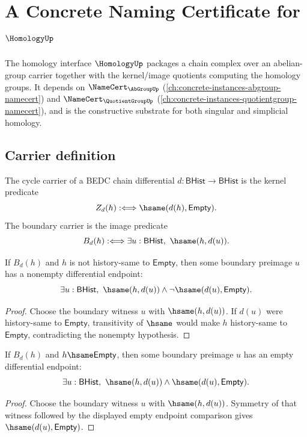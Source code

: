 \chapter{A Concrete Naming Certificate for $\HomologyUp$}
\label{ch:concrete-instances-homology-namecert}

The homology interface $\HomologyUp$ packages a chain complex over an abelian-group carrier together with the kernel/image quotients computing the homology groups. It depends on $\NameCert_{\AbGroupUp}$ (\autoref{ch:concrete-instances-abgroup-namecert}) and $\NameCert_{\QuotientGroupUp}$ (\autoref{ch:concrete-instances-quotientgroup-namecert}), and is the constructive substrate for both singular and simplicial homology.

\section{Carrier definition}
\label{sec:homology-carrier}

The cycle carrier of a BEDC chain differential $d:\mathsf{BHist}\to
\mathsf{BHist}$ is the kernel predicate
$$
Z_d(h) :\Longleftrightarrow \hsame(d(h),\mathsf{Empty}).
$$
The boundary carrier is the image predicate
$$
B_d(h) :\Longleftrightarrow \exists u:\mathsf{BHist},\ \hsame(h,d(u)).
$$

\begin{theorem}
\label{thm:homology-boundary-carrier-nonempty-preimage}
If $B_d(h)$ and $h$ is not history-same to $\mathsf{Empty}$, then some
boundary preimage $u$ has a nonempty differential endpoint:
$$
\exists u:\mathsf{BHist},\
\hsame(h,d(u))\land \neg\hsame(d(u),\mathsf{Empty}).
$$
\end{theorem}
\begin{proof}
Choose the boundary witness $u$ with $\hsame(h,d(u))$. If $d(u)$ were
history-same to $\mathsf{Empty}$, transitivity of $\hsame$ would make $h$
history-same to $\mathsf{Empty}$, contradicting the nonempty hypothesis.
\end{proof}

\begin{theorem}
\label{thm:homology-boundary-carrier-empty-preimage}
If $B_d(h)$ and $h\hsame\mathsf{Empty}$, then some boundary preimage $u$
has an empty differential endpoint:
$$
\exists u:\mathsf{BHist},\
\hsame(h,d(u))\land \hsame(d(u),\mathsf{Empty}).
$$
\end{theorem}
\begin{proof}
Choose the boundary witness $u$ with $\hsame(h,d(u))$. Symmetry of that
witness followed by the displayed empty endpoint comparison gives
$\hsame(d(u),\mathsf{Empty})$.
\end{proof}

